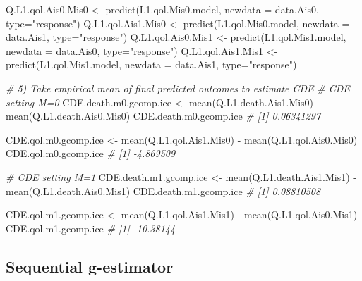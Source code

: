 \documentclass[
]{book}
\newenvironment{Shaded}{\begin{snugshade}}{\end{snugshade}}
\newcommand{\AttributeTok}[1]{\textcolor[rgb]{0.77,0.63,0.00}{#1}}
\newcommand{\CommentTok}[1]{\textcolor[rgb]{0.56,0.35,0.01}{\textit{#1}}}
\newcommand{\FunctionTok}[1]{\textcolor[rgb]{0.00,0.00,0.00}{#1}}
\newcommand{\NormalTok}[1]{#1}
\newcommand{\OtherTok}[1]{\textcolor[rgb]{0.56,0.35,0.01}{#1}}
\newcommand{\SpecialCharTok}[1]{\textcolor[rgb]{0.00,0.00,0.00}{#1}}
\newcommand{\StringTok}[1]{\textcolor[rgb]{0.31,0.60,0.02}{#1}}
\begin{document}
\begin{Shaded}
\begin{Highlighting}[]
\NormalTok{Q.L1.qol.Ais0.Mis0 }\OtherTok{\textless{}{-}} \FunctionTok{predict}\NormalTok{(L1.qol.Mis0.model, }\AttributeTok{newdata =}\NormalTok{ data.Ais0, }\AttributeTok{type=}\StringTok{"response"}\NormalTok{)}
\NormalTok{Q.L1.qol.Ais1.Mis0 }\OtherTok{\textless{}{-}} \FunctionTok{predict}\NormalTok{(L1.qol.Mis0.model, }\AttributeTok{newdata =}\NormalTok{ data.Ais1, }\AttributeTok{type=}\StringTok{"response"}\NormalTok{)}
\NormalTok{Q.L1.qol.Ais0.Mis1 }\OtherTok{\textless{}{-}} \FunctionTok{predict}\NormalTok{(L1.qol.Mis1.model, }\AttributeTok{newdata =}\NormalTok{ data.Ais0, }\AttributeTok{type=}\StringTok{"response"}\NormalTok{)}
\NormalTok{Q.L1.qol.Ais1.Mis1 }\OtherTok{\textless{}{-}} \FunctionTok{predict}\NormalTok{(L1.qol.Mis1.model, }\AttributeTok{newdata =}\NormalTok{ data.Ais1, }\AttributeTok{type=}\StringTok{"response"}\NormalTok{)}

\CommentTok{\# 5) Take empirical mean of final predicted outcomes to estimate CDE}
\CommentTok{\# CDE setting M=0}
\NormalTok{CDE.death.m0.gcomp.ice }\OtherTok{\textless{}{-}} \FunctionTok{mean}\NormalTok{(Q.L1.death.Ais1.Mis0) }\SpecialCharTok{{-}} \FunctionTok{mean}\NormalTok{(Q.L1.death.Ais0.Mis0)}
\NormalTok{CDE.death.m0.gcomp.ice}
\CommentTok{\# [1] 0.06341297}

\NormalTok{CDE.qol.m0.gcomp.ice }\OtherTok{\textless{}{-}} \FunctionTok{mean}\NormalTok{(Q.L1.qol.Ais1.Mis0) }\SpecialCharTok{{-}} \FunctionTok{mean}\NormalTok{(Q.L1.qol.Ais0.Mis0)}
\NormalTok{CDE.qol.m0.gcomp.ice}
\CommentTok{\# [1] {-}4.869509}

\CommentTok{\# CDE setting M=1}
\NormalTok{CDE.death.m1.gcomp.ice }\OtherTok{\textless{}{-}} \FunctionTok{mean}\NormalTok{(Q.L1.death.Ais1.Mis1) }\SpecialCharTok{{-}} \FunctionTok{mean}\NormalTok{(Q.L1.death.Ais0.Mis1)}
\NormalTok{CDE.death.m1.gcomp.ice}
\CommentTok{\# [1] 0.08810508}

\NormalTok{CDE.qol.m1.gcomp.ice }\OtherTok{\textless{}{-}} \FunctionTok{mean}\NormalTok{(Q.L1.qol.Ais1.Mis1) }\SpecialCharTok{{-}} \FunctionTok{mean}\NormalTok{(Q.L1.qol.Ais0.Mis1)}
\NormalTok{CDE.qol.m1.gcomp.ice}
\CommentTok{\# [1] {-}10.38144}
\end{Highlighting}
\end{Shaded}

\hypertarget{sequential-g-estimator}{%
\subsection{Sequential g-estimator}\label{sequential-g-estimator}}
\end{document}
